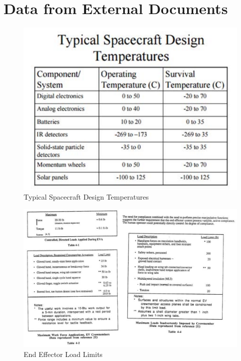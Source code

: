 \documentclass[12pt, letterpaper]{article}
\begin{document}
\section{Data from External Documents}
\begin{figure}[H]
\centering
\includegraphics[scale=1]{Apppic/designtemp}
\caption[Typical Spacecraft Design Temperatures]{Typical Spacecraft Design Temperatures \cite{spacedesigntemp}}
\end{figure}
\begin{figure}[H]
\centering
\includegraphics[scale=1]{Apppic/eeloads}
\caption[End Effector Load Limits]{End Effector Load Limits \cite{NASAEE_Mishkin}}
\end{figure}
\end{document}
